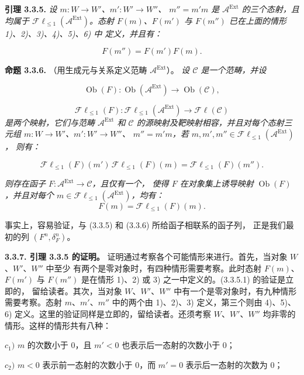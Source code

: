\clearpage
{}%
\begingroup\small\setlength{\parskip}{0pt}\setlength{\emergencystretch}{1.5em}
\setlength{\abovedisplayskip}{4pt plus 2pt minus 2pt}%
\setlength{\belowdisplayskip}{4pt plus 2pt minus 2pt}%

\medskip\noindent\textbf{引理 3.3.5.}\quad
\textit{设 $m\colon W\longrightarrow W'$、$m'\colon W'\longrightarrow W''$、
$m''=m'm$ 是 $\mathcal A^{\operatorname{Ext}}$ 的三个态射，且均属于
$\mathcal F\ell_{\leq 1}(\mathcal A^{\operatorname{Ext}})$。态射
$F(m)$、$F(m')$ 与 $F(m'')$ 已在上面的情形 1)、2)、3)、4)、5)、6) 中
定义，并且有：}

\begin{equation}
F(m'')=F(m')F(m).
\tag{3.3.5.1}
\end{equation}

\medskip\noindent\textbf{命题 3.3.6.}\quad
（用生成元与关系定义范畴 $\mathcal A^{\operatorname{Ext}}$）。
\textit{设 $\mathcal C$ 是一个范畴，并设}

\[
\operatorname{Ob}(F)\colon
\operatorname{Ob}(\mathcal A^{\operatorname{Ext}})
\longrightarrow \operatorname{Ob}(\mathcal C),
\]

\[
\mathcal F\ell_{\leq 1}(F)\colon
\mathcal F\ell_{\leq 1}(\mathcal A^{\operatorname{Ext}})
\longrightarrow \mathcal F\ell(\mathcal C)
\]
\textit{是两个映射，它们与范畴 $\mathcal A^{\operatorname{Ext}}$ 和
$\mathcal C$ 的源映射及靶映射相容，并且对每个态射三元组
$m\colon W\longrightarrow W'$、$m'\colon W'\longrightarrow W''$、
$m''=m'm$，若
$m,m',m''\in\mathcal F\ell_{\leq 1}(\mathcal A^{\operatorname{Ext}})$，
则有：}

\[
\mathcal F\ell_{\leq 1}(F)(m')\,
\mathcal F\ell_{\leq 1}(F)(m)
=\mathcal F\ell_{\leq 1}(F)(m'').
\]

\textit{则存在函子
$F\colon\mathcal A^{\operatorname{Ext}}\longrightarrow\mathcal C$，且仅有一个，
使得 $F$ 在对象集上诱导映射 $\operatorname{Ob}(F)$，并且对每个
$m\in\mathcal F\ell_{\leq 1}(\mathcal A^{\operatorname{Ext}})$，均有：}
\[
F(m)=\mathcal F\ell_{\leq 1}(F)(m).
\]

事实上，容易验证，与 (3.3.5) 和 (3.3.6) 所给函子相联系的函子列，
正是我们最初的列 $(F^n,\delta_F^n)$。

\medskip\noindent\textbf{3.3.7. 引理 3.3.5 的证明。}\quad
证明通过考察各个可能情形来进行。首先，当对象 $W$、$W'$、$W''$ 中至少
有两个是零对象时，有四种情形需要考察。此时态射 $F(m)$、$F(m')$ 与
$F(m'')$ 是在情形 1)、2) 或 3) 之一中定义的。(3.3.5.1) 的验证是立即的，
留给读者。其次，当对象 $W$、$W'$、$W''$ 中有一个是零对象时，有九种情形
需要考察。态射 $m$、$m'$、$m''$ 中的两个由 1)、2)、3) 定义，第三个则由
4)、5)、6) 定义。这里的验证同样是立即的，留给读者。还须考察
$W$、$W'$、$W''$ 均非零的情形。这样的情形共有八种：

\noindent$c_1)$ $m$ 的次数小于 0，且 $m'<0$ 也表示后一态射的次数小于 0；

\noindent$c_2)$ $m<0$ 表示前一态射的次数小于 0，而 $m'=0$ 表示后一态射的次数为 0；
\endgroup
